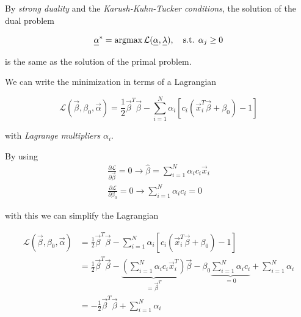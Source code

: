 By \textit{strong duality} and the \textit{Karush-Kuhn-Tucker conditions}, the solution of the dual problem

\begin{equation}
    \vec{\alpha}^* = \argmax \mathcal{L}(\vec{\alpha}, \vec{\lambda}), \quad \text{s.t. } \alpha_j \geq 0
\end{equation}

is the same as the solution of the primal problem.


We can write the minimization in terms of a Lagrangian

\begin{equation}
    \mathcal{L}(\vec{\beta}, \beta_0, \vec{\alpha}) = \frac{1}{2} \vec{\beta}^T \vec{\beta} - \sum_{i=1}^N \alpha_i \left[ c_i \left( \vec{x}_i^T \vec{\beta} + \beta_0 \right) - 1 \right]
\end{equation}

with \textit{Lagrange multipliers} $\alpha_i$.

By using
\begin{equation}
    \begin{gathered}
    \frac{\partial \mathcal{L}}{\partial \vec{\beta}}=0 \rightarrow \hat{\beta}=\sum_{i=1}^N \alpha_i c_i \vec{x}_i \\
    \frac{\partial \mathcal{L}}{\partial \beta_0}=0 \rightarrow \sum_{i=1}^N \alpha_i c_i=0
    \end{gathered}
\end{equation}


with this we can simplify the Lagrangian

\begin{equation}
    \begin{aligned}
    \mathcal{L}(\vec{\beta}, \beta_0, \vec{\alpha}) &= \frac{1}{2} \vec{\beta}^T \vec{\beta} - \sum_{i=1}^N \alpha_i \left[ c_i \left( \vec{x}_i^T \vec{\beta} + \beta_0 \right) - 1 \right] \\
                                                    &= \frac{1}{2} \vec{\beta}^T \vec{\beta} - \underbrace{\left(\sum_{i=1}^N \alpha_i c_i \vec{x}_i^T\right)}_{=\vec{\beta}^T} \vec{\beta} - \beta_0 \underbrace{\sum_{i=1}^N \alpha_i c_i}_{=0} + \sum_{i=1}^N \alpha_i  \\
                                                    &= - \frac{1}{2} \vec{\beta}^T \vec{\beta} + \sum_{i=1}^N \alpha_i
    \end{aligned}
\end{equation}

